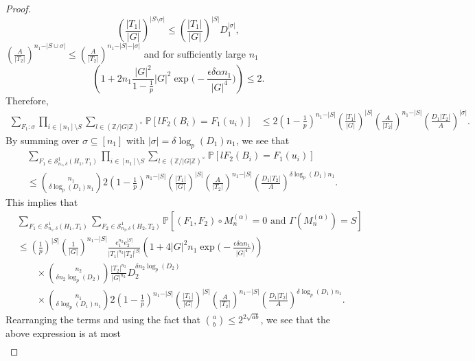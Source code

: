 \documentclass[10pt,a4paper]{amsart}
\newcommand{\Mna}{M_{n}^{(\alpha)}}
\newcommand{\PPP}{\mathbb{P}}
\newcommand{\SSO}[3]{\mathcal{S}^1_{#1}(#2,#3)}
\newcommand{\Z}{\mathbb{Z}}
\newcommand{\abs}[1]{\vert#1\vert}
\begin{document}
\begin{proof}
\[\left(\frac{\abs{T_1}}{\abs{G}}\right)^{\abs{S\setminus \sigma}}
\leq \left(\frac{\abs{T_1}}{\abs{G}}\right)^{\abs{S}} D_1^{\abs{\sigma}},
\]
$\left(\frac{A}{\abs{T_2}}\right)^{n_1-\abs{S\cup \sigma}}\leq \left(\frac{A}{\abs{T_2}}\right)^{n_1-\abs{S}-\abs{\sigma}}$ and for sufficiently large $n_1$
\[
\left(1+ 2n_1\frac{\abs{G}^2}{1-\frac{1}{p}} \abs{G}^2\exp\Big(-\frac{\epsilon\delta \alpha n_1}{|G|^4}\Big)\right)
\leq 2.
\]
Therefore,
\begin{align*}
\sum_{F_1:\sigma}
\prod_{i\in [n_1]\setminus S} \sum_{l\in (\Z/\abs{G}\Z)^{\times}} \PPP[l F_2(B_i)= F_1(u_i)]
&\leq 2 (1-\tfrac{1}{p})^{n_1-\abs{S}}
\left(\frac{\abs{T_1}}{\abs{G}}\right)^{\abs{S}}
\left(\frac{A}{\abs{T_2}}\right)^{n_1-\abs{S}}
\left(\frac{D_1\abs{T_2}}{A}\right)^{\abs{\sigma}}.
\end{align*}
By summing over $\sigma\subseteq[n_1]$ with $\abs{\sigma}= \delta\log_p(D_1) n_1$, we see that
\begin{align*}
&\sum_{F_1\in \SSO{n_1,\delta}{H_1}{T_1}}
\prod_{i\in [n_1]\setminus S} \sum_{l\in (\Z/\abs{G}\Z)^{\times}} \PPP[l F_2(B_i)= F_1(u_i)]\\
&\leq \binom{n_1}{\delta\log_p(D_1) n_1}
2 (1-\tfrac{1}{p})^{n_1-\abs{S}}
\left(\frac{\abs{T_1}}{\abs{G}}\right)^{\abs{S}}
\left(\frac{A}{\abs{T_2}}\right)^{n_1-\abs{S}}
\left(\frac{D_1\abs{T_2}}{A}\right)^{\delta\log_p(D_1) n_1}.
\end{align*}
This implies that
\begin{align*}
&\sum_{F_1\in \SSO{n_1,\delta}{H_1}{T_1}}
\sum_{F_2\in \SSO{n_2,\delta}{H_2}{T_2}}
\PPP[(F_1,F_2)\circ \Mna=0 \text{ and } \Gamma(\Mna)=S]\\
&\leq (\tfrac{1}{p})^{\abs{S}} (\tfrac{1}{\abs{G}})^{n_1-\abs{S}}
\frac{e_1^{n_2} e_2^{\abs{S}}}{\abs{T_1}^{n_2} \abs{T_2}^{\abs{S}}}
\left(1+4\abs{G}^2n_1 \exp\Big(-\frac{\epsilon \delta \alpha n_1}{|G|^4}\Big) \right)\\
&\quad\quad\times \binom{n_2}{\delta n_2\log_p(D_2)} \frac{\abs{T_2}^{n_2}}{\abs{G}^{n_2}} D_2^{\delta n_2\log_p(D_2)}\\
&\quad\quad\times\binom{n_1}{\delta\log_p(D_1) n_1}
2 (1-\tfrac{1}{p})^{n_1-\abs{S}}
\left(\frac{\abs{T_1}}{\abs{G}}\right)^{\abs{S}}
\left(\frac{A}{\abs{T_2}}\right)^{n_1-\abs{S}}
\left(\frac{D_1\abs{T_2}}{A}\right)^{\delta\log_p(D_1) n_1}.
\end{align*}
Rearranging the terms and using the fact that $\binom{a}{b}\leq 2^{2\sqrt{ab}}$, we see that the above expression is at most
\begin{align*}

\end{align*}
\end{proof}
\end{document}
